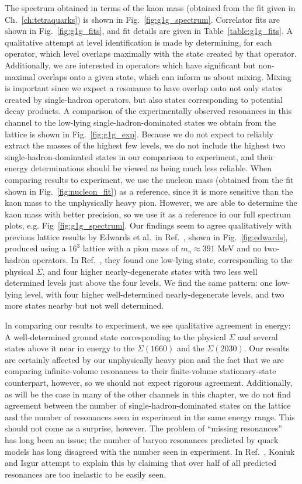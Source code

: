 The spectrum obtained in terms of the kaon mass (obtained from the fit given in Ch.~\ref{ch:tetraquarks}) is shown in Fig.~\ref{fig:g1g_spectrum}. Correlator fits are shown in Fig.~\ref{fig:g1g_fits}, and fit details are given in Table~\ref{table:g1g_fits}. A qualitative attempt at level identification is made by determining, for each operator, which level overlaps maximally with the state created by that operator. Additionally, we are interested in operators which have significant but non-maximal overlaps onto a given state, which can inform us about mixing. Mixing is important since we expect a resonance to have overlap onto not only states created by single-hadron operators, but also states corresponding to potential decay products. A comparison of the experimentally observed resonances in this channel to the low-lying single-hadron-dominated states we obtain from the lattice is shown in Fig.~\ref{fig:g1g_exp}. Because we do not expect to reliably extract the masses of the highest few levels, we do not include the highest two single-hadron-dominated states in our comparison to experiment, and their energy determinations should be viewed as being much less reliable. When comparing results to experiment, we use the nucleon mass (obtained from the fit shown in Fig.~\ref{fig:nucleon_fit}) as a reference, since it is more sensitive than the kaon mass to the unphysically heavy pion. However, we are able to determine the kaon mass with better precision, so we use it as a reference in our full spectrum plots, e.g. Fig~\ref{fig:g1g_spectrum}. Our findings seem to agree qualitatively with previous lattice results by Edwards et al.\ in Ref.~\cite{Edwards:2012fx}, shown in Fig.~\ref{fig:edwards}, produced using a $16^3$ lattice with a pion mass of $m_\pi \approx 391$ MeV and no two-hadron operators. In Ref.~\cite{Edwards:2012fx}, they found one low-lying state, corresponding to the physical $\Sigma$, and four higher nearly-degenerate states with two less well determined levels just above the four levels. We find the same pattern: one low-lying level, with four higher well-determined nearly-degenerate levels, and two more states nearby but not well determined.

In comparing our results to experiment, we see qualitative agreement in energy: A well-determined ground state corresponding to the physical $\Sigma$ and several states above it near in energy to the $\Sigma(1660)$ and the $\Sigma(2030)$. Our results are certainly affected by our unphysically heavy pion and the fact that we are comparing infinite-volume resonances to their finite-volume stationary-state counterpart, however, so we should not expect rigorous agreement. Additionally, as will be the case in many of the other channels in this chapter, we do not find agreement between the number of single-hadron-dominated states on the lattice and the number of resonances seen in experiment in the same energy range. This should not come as a surprise, however. The problem of ``missing resonances''~\cite{Koniuk:1979vw} has long been an issue; the number of baryon resonances predicted by quark models has long disagreed with the number seen in experiment. In Ref.~\cite{Koniuk:1979vw}, Koniuk and Isgur attempt to explain this by claiming that over half of all predicted resonances are too inelastic to be easily seen.

